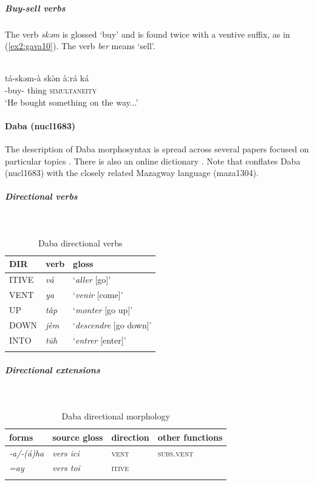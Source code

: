 \subparagraph{Buy-sell verbs}

The verb \textit{skəm} is glossed `buy' and is found twice with a ventive suffix, as in (\ref{ex2:gava10}). The verb \textit{ber} means `sell'.

\ea\label{ex2:gava10}
 \\
\gll tá-skəm-à skə̀n àːrá ká \\
-buy- thing \textsc{simultaneity}  \\
\glt `He bought something on the way...'
\z 

\paragraph*{Daba (nucl1683)} \label{daba}

The description of Daba morphosyntax is spread across several papers focused on particular topics \citep{lienhardDabaGrammarClause1978,lienhardVerbeDaba1980,lienhardModaliteVerbeDaba1986,lienhardDocumentReferencePour2009}. There is also an online dictionary \citep{webonaryDictionnaireDaba2019}. Note that \citet{schuhChadicCornucopia2017} conflates Daba (nucl1683) with the closely related Mazagway language (maza1304).



\subparagraph{Directional verbs}~

\begin{table}[H]
\caption{Daba directional verbs} 
\label{tab:dabaV}
\begin{tabular}{lll} %
	\lsptoprule
	DIR & verb & gloss   \\ %
	\midrule
	ITIVE & \textit{vá} & `\textit{aller} [go]' \\
	VENT & \textit{ya} & `\textit{venir} [come]' \\
	UP & \textit{tàp} & `\textit{monter} [go up]' \\
	DOWN & \textit{jèm} &`\textit{descendre} [go down]' \\
	INTO& \textit{tūh} & `\textit{entrer} [enter]' \\
	\lspbottomrule
\end{tabular}
\end{table}

\subparagraph{Directional extensions}~

\begin{table}[H]
\caption{Daba directional morphology}
\label{tab:daba}
\begin{tabular}{llll} %
	\lsptoprule
	forms & source gloss & direction  & other functions  \\ %
	\midrule
	\textit{-a/-(á)ha}  &  \textit{vers ici} &   \textsc{vent} &   \textsc{subs.vent}  \\
	\textit{=ay}  &  \textit{vers toi} & \textsc{itive}  &    \\ 	
	\lspbottomrule
\end{tabular}
\end{table} 

